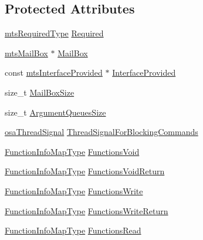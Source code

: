 \subsection*{Protected Attributes}
\begin{DoxyCompactItemize}
\item 
\hyperlink{mts_forward_declarations_8h_a9ef1ce54724afde7802db326ff8606f3}{mts\+Required\+Type} \hyperlink{classmts_interface_required_afab8d38a3a48765ecdf8d4349521f01e}{Required}
\item 
\hyperlink{classmts_mail_box}{mts\+Mail\+Box} $\ast$ \hyperlink{classmts_interface_required_a449f33d73348d11900eead13f009b89c}{Mail\+Box}
\item 
const \hyperlink{classmts_interface_provided}{mts\+Interface\+Provided} $\ast$ \hyperlink{classmts_interface_required_a9c35d946a1e0308d32495e94ba90978e}{Interface\+Provided}
\item 
size\+\_\+t \hyperlink{classmts_interface_required_a7e9f87dc80d231cab9df4bb446df964a}{Mail\+Box\+Size}
\item 
size\+\_\+t \hyperlink{classmts_interface_required_a4a401b5a34386931fc8378cb42fccf5b}{Argument\+Queues\+Size}
\item 
\hyperlink{classosa_thread_signal}{osa\+Thread\+Signal} \hyperlink{classmts_interface_required_a99419345347d51f917ed98a270ce9366}{Thread\+Signal\+For\+Blocking\+Commands}
\item 
\hyperlink{classmts_interface_required_a4c21eaf53811c5782bae6293904cffe5}{Function\+Info\+Map\+Type} \hyperlink{classmts_interface_required_ab2250cb695e1b187d6b4bbcc3a6cd73d}{Functions\+Void}
\item 
\hyperlink{classmts_interface_required_a4c21eaf53811c5782bae6293904cffe5}{Function\+Info\+Map\+Type} \hyperlink{classmts_interface_required_a0588d79b2eca17da7ab9dfe9be6464f1}{Functions\+Void\+Return}
\item 
\hyperlink{classmts_interface_required_a4c21eaf53811c5782bae6293904cffe5}{Function\+Info\+Map\+Type} \hyperlink{classmts_interface_required_af065f884f6aaac85d342b49bf6673528}{Functions\+Write}
\item 
\hyperlink{classmts_interface_required_a4c21eaf53811c5782bae6293904cffe5}{Function\+Info\+Map\+Type} \hyperlink{classmts_interface_required_a4ce7797bea9968322e404e09a289196f}{Functions\+Write\+Return}
\item 
\hyperlink{classmts_interface_required_a4c21eaf53811c5782bae6293904cffe5}{Function\+Info\+Map\+Type} \hyperlink{classmts_interface_required_a0bbaaa1a252a893b921a02c61febf597}{Functions\+Read}

\end{DoxyCompactItemize}

